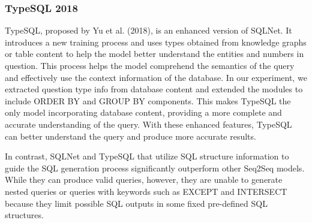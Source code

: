 \subsubsection{TypeSQL 2018}

TypeSQL, proposed by Yu et al. (2018), is an enhanced version of SQLNet. It introduces a new training process and uses types obtained from knowledge graphs or table content to help the model better understand the entities and numbers in question. This process helps the model comprehend the semantics of the query and effectively use the context information of the database. In our experiment, we extracted question type info from database content and extended the modules to include ORDER BY and GROUP BY components. This makes TypeSQL the only model incorporating database content, providing a more complete and accurate understanding of the query. With these enhanced features, TypeSQL can better understand the query and produce more accurate results.

In contrast, SQLNet and TypeSQL that utilize SQL structure information to guide the SQL generation process significantly outperform other Seq2Seq models. While they can produce valid queries, however, they are unable to generate nested queries or queries with keywords such as EXCEPT and INTERSECT because they limit possible SQL outputs in some fixed pre-defined SQL structures.